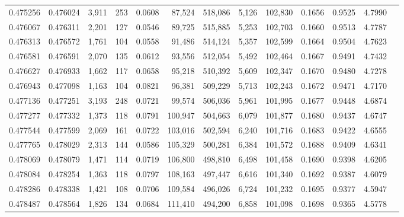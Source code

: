 \begin{tabular}{rrrrrrrrrrrrr}
0.475256 & 0.476024 & 3,911 &   253 &                                     0.0608 &  87,524 & 518,086 &   5,126 & 102,830 & 0.1656 & 0.9525 & 4.7990 \\
0.476067 & 0.476311 & 2,201 &   127 &                                     0.0546 &  89,725 & 515,885 &   5,253 & 102,703 & 0.1660 & 0.9513 & 4.7787 \\
0.476313 & 0.476572 & 1,761 &   104 &                                     0.0558 &  91,486 & 514,124 &   5,357 & 102,599 & 0.1664 & 0.9504 & 4.7623 \\
0.476581 & 0.476591 & 2,070 &   135 &                                     0.0612 &  93,556 & 512,054 &   5,492 & 102,464 & 0.1667 & 0.9491 & 4.7432 \\
0.476627 & 0.476933 & 1,662 &   117 &                                     0.0658 &  95,218 & 510,392 &   5,609 & 102,347 & 0.1670 & 0.9480 & 4.7278 \\
0.476943 & 0.477098 & 1,163 &   104 &                                     0.0821 &  96,381 & 509,229 &   5,713 & 102,243 & 0.1672 & 0.9471 & 4.7170 \\
0.477136 & 0.477251 & 3,193 &   248 &                                     0.0721 &  99,574 & 506,036 &   5,961 & 101,995 & 0.1677 & 0.9448 & 4.6874 \\
0.477277 & 0.477332 & 1,373 &   118 &                                     0.0791 & 100,947 & 504,663 &   6,079 & 101,877 & 0.1680 & 0.9437 & 4.6747 \\
0.477544 & 0.477599 & 2,069 &   161 &                                     0.0722 & 103,016 & 502,594 &   6,240 & 101,716 & 0.1683 & 0.9422 & 4.6555 \\
0.477765 & 0.478029 & 2,313 &   144 &                                     0.0586 & 105,329 & 500,281 &   6,384 & 101,572 & 0.1688 & 0.9409 & 4.6341 \\
0.478069 & 0.478079 & 1,471 &   114 &                                     0.0719 & 106,800 & 498,810 &   6,498 & 101,458 & 0.1690 & 0.9398 & 4.6205 \\
0.478084 & 0.478254 & 1,363 &   118 &                                     0.0797 & 108,163 & 497,447 &   6,616 & 101,340 & 0.1692 & 0.9387 & 4.6079 \\
0.478286 & 0.478338 & 1,421 &   108 &                                     0.0706 & 109,584 & 496,026 &   6,724 & 101,232 & 0.1695 & 0.9377 & 4.5947 \\
0.478487 & 0.478564 & 1,826 &   134 &                                     0.0684 & 111,410 & 494,200 &   6,858 & 101,098 & 0.1698 & 0.9365 & 4.5778 \\

\end{tabular}

